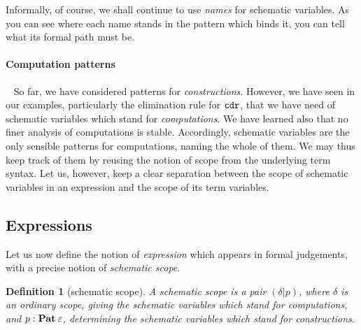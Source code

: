 \documentclass{jfp1}
\newtheorem{definition}[theorem]{Definition}
\newcommand{\emp}{\varepsilon}
\begin{document}
Informally, of course, we shall continue to use \emph{names} for
schematic variables. As you can see where each name stands in the
pattern which binds it, you can tell what its formal path must be.

\paragraph{Computation patterns}~
So far, we have considered patterns for \emph{constructions}. However,
we have seen in our examples, particularly the elimination rule for
$\texttt{cdr}$, that we have need of schematic variables which stand for
\emph{computations}. We have learned also that no finer analysis of
computations is stable. Accordingly, schematic variables are the only
sensible patterns for computations, naming the whole of them. We may
thus keep track of them by reusing the notion of scope from the
underlying term syntax. Let us, however, keep a clear separation
between the scope of schematic variables in an expression and the
scope of its term variables.


\subsection{Expressions}

Let us now define the notion of \emph{expression} which appears in
formal judgements, with a precise notion of \emph{schematic scope}.

\newcommand{\ssc}[2]{(#1|#2)}
\begin{definition}[schematic scope]
  A schematic scope is a pair $\ssc\delta p$, where $\delta$ is an
  ordinary scope, giving the schematic variables which stand for
  computations, and $p : \Pat\emp$, determining the schematic
  variables which stand for constructions.
\end{definition}
\end{document}
